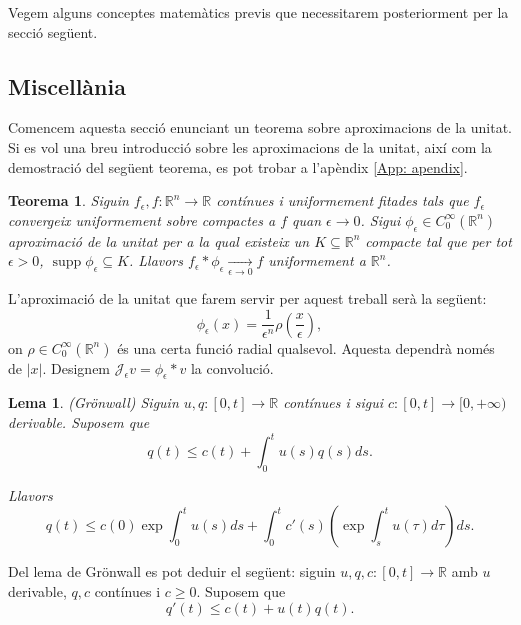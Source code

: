 \documentclass{article}
\numberwithin{equation}{section}
\DeclareMathOperator{\supp}{supp}
\newtheorem{teorema}{Teorema}[section]
\newtheorem{lema}{Lema}[section]
\begin{document}
Vegem alguns conceptes matem\`{a}tics previs que necessitarem posteriorment per la secci\'{o} seg\"{u}ent.

\subsection{Miscel\textperiodcentered l\`{a}nia}\label{Sse: miscellania}

Comencem aquesta secci\'{o} enunciant un teorema sobre aproximacions de la unitat. Si es vol una breu introducci\'{o} sobre les aproximacions de la unitat, aix\'{i} com la demostraci\'{o} del seg\"{u}ent teorema, es pot trobar a l'ap\`{e}ndix \ref{App: apendix}.

\begin{teorema}\label{Teo: successio suavitzada}
Siguin $f_{\epsilon},f:\mathbb{R}^n\rightarrow\mathbb{R}$ cont\'{i}nues i uniformement fitades tals que $f_{\epsilon}$ convergeix uniformement sobre compactes a $f$ quan $\epsilon\to0$. Sigui $\phi_{\epsilon}\in C_0^{\infty}(\mathbb{R}^n)$ aproximaci\'{o} de la unitat per a la qual existeix un $K\subseteq\mathbb{R}^n$ compacte tal que per tot $\epsilon>0$, $\supp\phi_{\epsilon}\subseteq K$. Llavors $f_{\epsilon}*\phi_{\epsilon}\xrightarrow[\epsilon\to0]{}f$ uniformement a $\mathbb{R}^n$.
\end{teorema}

L'aproximaci\'{o} de la unitat que farem servir per aquest treball ser\`{a} la seg\"{u}ent:
\begin{equation}\label{Equ. aproximacio unitat}
\phi_{\epsilon}(x)=\frac{1}{\epsilon^n}\rho\left(\frac{x}{\epsilon}\right),
\end{equation}
on $\rho\in C_0^{\infty}(\mathbb{R}^n)$ \'{e}s una certa funci\'{o} radial qualsevol. Aquesta dependr\`{a} nom\'{e}s de $|x|$. Designem $\mathcal{J}_{\epsilon}v=\phi_{\epsilon}*v$ la convoluci\'{o}.

\begin{lema}\label{Lem: Gronwall}
(Gr\"{o}nwall) Siguin $u,q:[0,t]\rightarrow\mathbb{R}$ cont\'{i}nues i sigui $c:[0,t]\rightarrow[0,+\infty)$ derivable. Suposem que
\[q(t)\leq c(t)+\int_0^tu(s)q(s)ds.\]

Llavors
\[q(t)\leq c(0)\exp\int_0^tu(s)ds+\int_0^tc'(s)\left(\exp\int_s^tu(\tau)d\tau\right)ds.\]
\end{lema}

Del lema de Gr\"{o}nwall es pot deduir el seg\"{u}ent: siguin $u,q,c:[0,t]\rightarrow\mathbb{R}$ amb $u$ derivable, $q,c$ cont\'{i}nues i $c\geq0$. Suposem que
\[q'(t)\leq c(t)+u(t)q(t).\]
\end{document}
